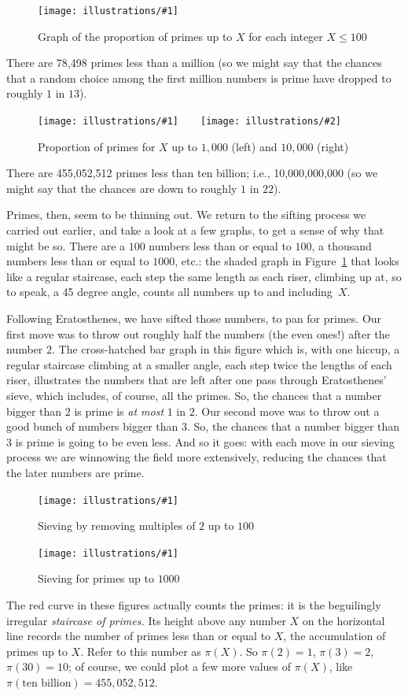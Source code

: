 \documentclass[openany]{book}
\newcommand{\ill}[3]{%
   \begin{figure}[H]%
   \vspace{-2ex}
   \centering%
   \texttt{[image: illustrations/\#1]}%
   \caption{#3}%
   \vspace{-2ex}
    \end{figure}}
\newcommand{\illtwo}[4]{%
   \begin{figure}[H]\centering%
   \texttt{[image: illustrations/\#1]}$\qquad$\texttt{[image: illustrations/\#2]}%
   \caption{#4}%
    \end{figure}}
\theoremstyle{plain}
\theoremstyle{definition}
\begin{document}
\ill{proportion_primes_100}{1}{Graph of the proportion of primes up to $X$ for each integer $X\leq 100$}

There are 78,498 primes less than a million (so we might say that
the chances that a random choice among the first million numbers is
prime have dropped to roughly $1$ in $13$).

\illtwo{proportion_primes_1000}{proportion_primes_10000}{0.46}{Proportion of primes for $X$ up to $1{,}000$ (left) and $10{,}000$ (right)}

There are 455,052,512 primes less than ten billion; i.e.,
10,000,000,000 (so we might say that the chances are down to roughly
$1$ in $22$).

Primes, then, seem to be thinning out.  We return to the sifting process
we carried out earlier, and take a look at a few graphs, to get a sense of why
that might be so. There are a $100$ numbers less than or equal to
$100$, a thousand numbers less than or equal to $1000$, etc.: the
shaded graph in Figure~\ref{fig:sieve_2_100} that looks like a regular staircase, each step the
same length as each riser, climbing up at, so to speak, a 45 degree
angle, counts all numbers up to and including~$X$.

Following Eratosthenes, we have sifted those numbers, to pan for
primes. Our first move was to throw out roughly half the numbers (the
even ones!) after the number $2$. The cross-hatched bar graph in this
figure which is, with one hiccup, a regular staircase climbing at a
smaller angle, each step twice the lengths of each riser, illustrates
the numbers that are left after one pass through Eratosthenes' sieve,
which includes, of course, all the primes. So, the chances that a
number bigger than $2$ is prime is {\em at most} $1$ in $2$.  Our
second move was to throw out a good bunch of numbers bigger than $3$.
So, the chances that a number bigger than $3$ is prime is going to be
even less.  And so it goes: with each move in our
sieving process we are winnowing the field more extensively, reducing
the chances that the later numbers are prime.

\ill{sieve_2_100}{.8}{Sieving by removing multiples of $2$ up to $100$\label{fig:sieve_2_100}}
\ill{sieve1000}{.8}{Sieving for primes up to $1000$}

The red curve in these figures actually counts the primes: it is the
beguilingly irregular {\em staircase of primes.}  Its height above any
number $X$ on the horizontal line records the number of primes less
than or equal to $X$, the accumulation of primes up to $X$.  Refer to
this number as $\pi(X)$. So $\pi(2)=1$, $\pi(3) = 2$, $\pi(30) = 10$;
of course, we could plot a few more values of $\pi(X)$, like
$\pi(\text{ten billion}) = 455,052,512$.
\end{document}
